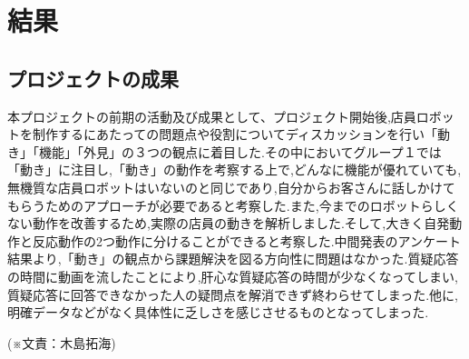 \chapter{結果}
\section{プロジェクトの成果}
本プロジェクトの前期の活動及び成果として、プロジェクト開始後,店員ロボットを制作するにあたっての問題点や役割についてディスカッションを行い「動き」「機能」「外見」の３つの観点に着目した.その中においてグループ１では「動き」に注目し,「動き」の動作を考察する上で,どんなに機能が優れていても,無機質な店員ロボットはいないのと同じであり,自分からお客さんに話しかけてもらうためのアプローチが必要であると考察した.また,今までのロボットらしくない動作を改善するため,実際の店員の動きを解析しました.そして,大きく自発動作と反応動作の2つ動作に分けることができると考察した.中間発表のアンケート結果より,「動き」の観点から課題解決を図る方向性に問題はなかった.質疑応答の時間に動画を流したことにより,肝心な質疑応答の時間が少なくなってしまい,質疑応答に回答できなかった人の疑問点を解消できず終わらせてしまった.他に,明確データなどがなく具体性に乏しさを感じさせるものとなってしまった.
\begin{flushright}
(※文責：木島拓海)
\end{flushright}
